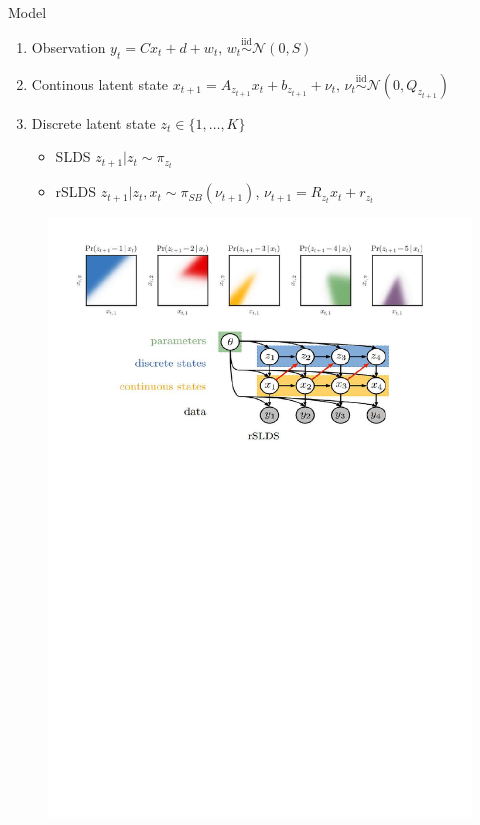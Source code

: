 \documentclass{beamer}
\begin{document}
\begin{frame}{Model}%

\begin{tcolorbox}[colback=blue!10!white,colframe=blue!50!black,title=SLDS and rSLDS,boxrule=2pt, boxsep=0.1em, left=0.1em, right=0.1em,
fontupper=\fontsize{8}{10}\selectfont] %
\begin{enumerate}[\textbullet]
\item Observation $y_t=C x_t+d+w_t\text{, }w_t \overset{\mathrm{iid}}{\sim} \mathcal{N}(0,S)$
\item Continous latent state $x_{t+1}=A_{z_{t+1}}x_t+b_{z_{t+1}}+\nu_t \text{, } \nu_t \overset{\mathrm{iid}}{\sim} \mathcal{N}(0,Q_{z_{t+1}})$
    \item Discrete latent state $z_t \in \{1,\dots,K\}$
        \begin{itemize}
            \item SLDS 
$z_{t+1} | z_t \sim \pi_{z_t}$
            \item rSLDS
 $z_{t+1} | z_t, x_t \sim \pi_{SB}(\nu_{t+1})$, $\nu_{t+1}=R_{z_t}x_t+r_{z_t}$
        \end{itemize}
\end{enumerate}
\end{tcolorbox}

\begin{figure}
    \centering
    \includegraphics[width=0.8\linewidth]{gallery/model_p1.pdf}
    \caption{}
  \end{figure}




\end{frame}
\end{document}
